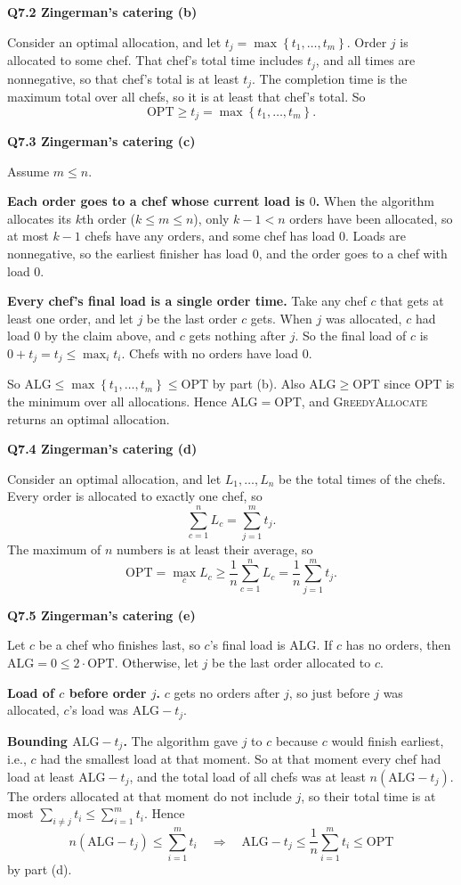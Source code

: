 \documentclass[11pt]{article}
\newcommand{\set}[1]{\left\{#1\right\}}
\newcommand{\OPT}{\mathrm{OPT}}
\newcommand{\ALG}{\mathrm{ALG}}
\newcommand{\algo}[1]{\textsc{#1}}
\newcommand{\qpage}[1]{\clearpage\noindent\textbf{\large #1}\par\medskip}
\begin{document}
\qpage{Q7.2 Zingerman's catering (b)}

Consider an optimal allocation, and let $t_j = \max\set{t_1, \ldots, t_m}$.
Order $j$ is allocated to some chef.
That chef's total time includes $t_j$, and all times are nonnegative, so that chef's total is at least $t_j$.
The completion time is the maximum total over all chefs, so it is at least that chef's total.
So
\[
  \OPT \geq t_j = \max\set{t_1, \ldots, t_m}.
\]

\qpage{Q7.3 Zingerman's catering (c)}

Assume $m \leq n$.

\textbf{Each order goes to a chef whose current load is $0$.}
When the algorithm allocates its $k$th order ($k \leq m \leq n$), only $k - 1 < n$ orders have been allocated, so at most $k - 1$ chefs have any orders, and some chef has load $0$.
Loads are nonnegative, so the earliest finisher has load $0$, and the order goes to a chef with load $0$.

\textbf{Every chef's final load is a single order time.}
Take any chef $c$ that gets at least one order, and let $j$ be the last order $c$ gets.
When $j$ was allocated, $c$ had load $0$ by the claim above, and $c$ gets nothing after $j$.
So the final load of $c$ is $0 + t_j = t_j \leq \max_i t_i$.
Chefs with no orders have load $0$.

So $\ALG \leq \max\set{t_1, \ldots, t_m} \leq \OPT$ by part (b).
Also $\ALG \geq \OPT$ since $\OPT$ is the minimum over all allocations.
Hence $\ALG = \OPT$, and \algo{GreedyAllocate} returns an optimal allocation.

\qpage{Q7.4 Zingerman's catering (d)}

Consider an optimal allocation, and let $L_1, \ldots, L_n$ be the total times of the chefs.
Every order is allocated to exactly one chef, so
\[
  \sum_{c=1}^{n} L_c = \sum_{j=1}^{m} t_j.
\]
The maximum of $n$ numbers is at least their average, so
\[
  \OPT = \max_c L_c \geq \frac{1}{n} \sum_{c=1}^{n} L_c = \frac{1}{n} \sum_{j=1}^{m} t_j.
\]

\qpage{Q7.5 Zingerman's catering (e)}

Let $c$ be a chef who finishes last, so $c$'s final load is $\ALG$.
If $c$ has no orders, then $\ALG = 0 \leq 2 \cdot \OPT$.
Otherwise, let $j$ be the last order allocated to $c$.

\textbf{Load of $c$ before order $j$.}
$c$ gets no orders after $j$, so just before $j$ was allocated, $c$'s load was $\ALG - t_j$.

\textbf{Bounding $\ALG - t_j$.}
The algorithm gave $j$ to $c$ because $c$ would finish earliest, i.e., $c$ had the smallest load at that moment.
So at that moment every chef had load at least $\ALG - t_j$, and the total load of all chefs was at least $n(\ALG - t_j)$.
The orders allocated at that moment do not include $j$, so their total time is at most $\sum_{i \neq j} t_i \leq \sum_{i=1}^m t_i$.
Hence
\[
  n(\ALG - t_j) \leq \sum_{i=1}^m t_i
  \quad\Longrightarrow\quad
  \ALG - t_j \leq \frac{1}{n} \sum_{i=1}^m t_i \leq \OPT
\]
by part (d).
\end{document}
